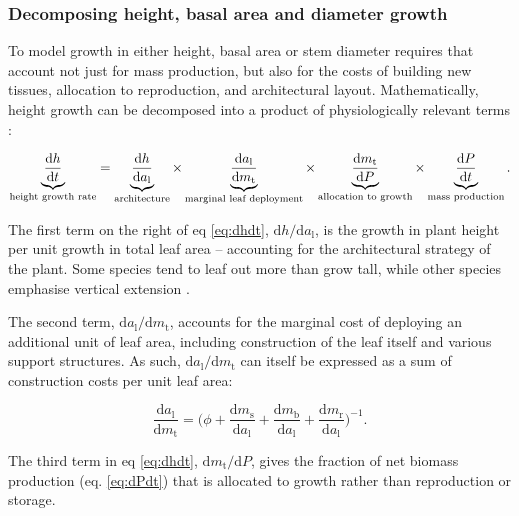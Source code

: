 \documentclass[12pt, a4paper]{article}
\begin{document}
\subsubsection{Decomposing height, basal area and diameter growth}

To model growth in either height, basal area or stem diameter requires that account not just for mass production, but also for the costs of building new tissues, allocation to reproduction, and architectural layout. Mathematically, height growth can be decomposed into a product of physiologically relevant terms \citep{falster-2011}:

\begin{equation} \label{eq:dhdt}
\underbrace{\strut\frac{\textrm{d}h}{\textrm{d}t}}_\textrm{height growth rate}= \underbrace{\strut\frac{\textrm{d}h}{\textrm{d}a_\textrm{l}}}_\textrm{architecture}
\times \underbrace{\strut\frac{\textrm{d}a_\textrm{l}}{\textrm{d}m_\textrm{t}}}_\textrm{marginal leaf deployment}
\times \underbrace{\strut\frac{\textrm{d}m_\textrm{t}}{\textrm{d}P}}_\textrm{allocation to growth}
\times \underbrace{\strut\frac{\textrm{d}P}{\textrm{d}t}}_\textrm{mass production}.
\end{equation}

The first term on the right of eq \ref{eq:dhdt},
$\textrm{d}h / \textrm{d}a_\textrm{l}$, is the growth in plant height
per unit growth in total leaf area -- accounting for the architectural
strategy of the plant. Some species tend to leaf out more than grow
tall, while other species emphasise vertical
extension \citep{poorter-2006}.

The second term, $\textrm{d}a_\textrm{l} / \textrm{d}m_\textrm{t}$,
accounts for the marginal cost of deploying an additional unit of leaf
area, including construction of the leaf itself and various support
structures. As such, $\textrm{d}a_\textrm{l} / \textrm{d}m_\textrm{t}$
can itself be expressed as a sum of construction costs per unit leaf
area:

\begin{equation}\label{eq:daldmt}
\frac{\textrm{d}a_\textrm{l}}{\textrm{d}m_\textrm{t}}
= \big(\phi
 + \frac{\textrm{d}m_\textrm{s}}{\textrm{d}a_\textrm{l}} + \frac{\textrm{d}m_\textrm{b}}{\textrm{d}a_\textrm{l}} + \frac{\textrm{d}m_\textrm{r}}{\textrm{d}a_\textrm{l}}\big)^{-1}.
\end{equation}

The third term in eq \ref{eq:dhdt},
$\textrm{d}m_\textrm{t} / \textrm{d}P$, gives the fraction of net
biomass production (eq. \ref{eq:dPdt}) that is allocated to growth
rather than reproduction or storage.
\end{document}
